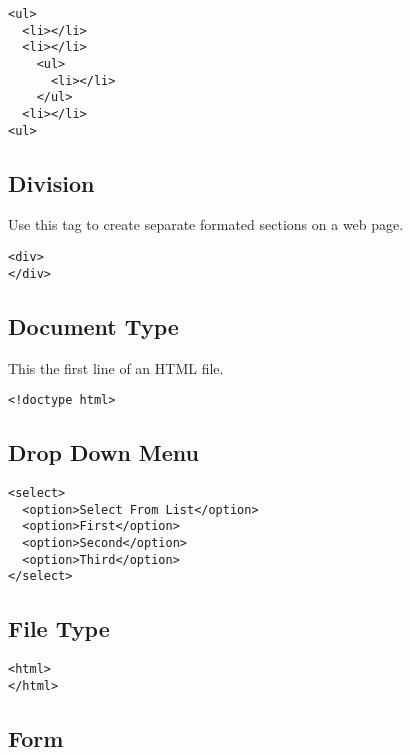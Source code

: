 \documentclass{article}
\begin{document}
\begin{lstlisting}
<ul>
  <li></li>
  <li></li>
    <ul>
      <li></li>
    </ul>
  <li></li>
<ul>
\end{lstlisting}

\subsection{Division}
Use this tag to create separate formated sections on a web page.

\begin{lstlisting}
<div>
</div>
\end{lstlisting}

\subsection{Document Type}
This the first line of an HTML file.

\begin{lstlisting}
<!doctype html>
\end{lstlisting}

\subsection{Drop Down Menu}
\begin{lstlisting}
<select>
  <option>Select From List</option>
  <option>First</option>
  <option>Second</option>
  <option>Third</option>
</select>
\end{lstlisting}

\subsection{File Type}
\begin{lstlisting}
<html>
</html>
\end{lstlisting}

\subsection{Form}

\end{document}

